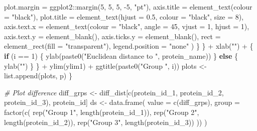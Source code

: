 \documentclass[
  11pt,
  oneside]{book}
\newenvironment{Shaded}{\begin{snugshade}}{\end{snugshade}}
\newcommand{\AttributeTok}[1]{\textcolor[rgb]{0.77,0.63,0.00}{#1}}
\newcommand{\CommentTok}[1]{\textcolor[rgb]{0.56,0.35,0.01}{\textit{#1}}}
\newcommand{\ControlFlowTok}[1]{\textcolor[rgb]{0.13,0.29,0.53}{\textbf{#1}}}
\newcommand{\DecValTok}[1]{\textcolor[rgb]{0.00,0.00,0.81}{#1}}
\newcommand{\FloatTok}[1]{\textcolor[rgb]{0.00,0.00,0.81}{#1}}
\newcommand{\FunctionTok}[1]{\textcolor[rgb]{0.00,0.00,0.00}{#1}}
\newcommand{\NormalTok}[1]{#1}
\newcommand{\OtherTok}[1]{\textcolor[rgb]{0.56,0.35,0.01}{#1}}
\newcommand{\SpecialCharTok}[1]{\textcolor[rgb]{0.00,0.00,0.00}{#1}}
\newcommand{\StringTok}[1]{\textcolor[rgb]{0.31,0.60,0.02}{#1}}
\begin{document}
\begin{Shaded}
\begin{Highlighting}[]
            \AttributeTok{plot.margin =}\NormalTok{ ggplot2}\SpecialCharTok{::}\FunctionTok{margin}\NormalTok{(}\DecValTok{5}\NormalTok{, }\DecValTok{5}\NormalTok{, }\DecValTok{5}\NormalTok{, }\SpecialCharTok{{-}}\DecValTok{5}\NormalTok{, }\StringTok{"pt"}\NormalTok{),}
            \AttributeTok{axis.title =} \FunctionTok{element\_text}\NormalTok{(}\AttributeTok{colour =} \StringTok{"black"}\NormalTok{),}
            \AttributeTok{plot.title =} \FunctionTok{element\_text}\NormalTok{(}\AttributeTok{hjust =} \FloatTok{0.5}\NormalTok{, }\AttributeTok{colour =} \StringTok{"black"}\NormalTok{, }\AttributeTok{size =} \DecValTok{8}\NormalTok{),}
            \AttributeTok{axis.text.x =} \FunctionTok{element\_text}\NormalTok{(}\AttributeTok{colour =} \StringTok{"black"}\NormalTok{, }\AttributeTok{angle =} \DecValTok{45}\NormalTok{, }\AttributeTok{vjust =} \DecValTok{1}\NormalTok{, }\AttributeTok{hjust =} \DecValTok{1}\NormalTok{),}
            \AttributeTok{axis.text.y =} \FunctionTok{element\_blank}\NormalTok{(),}
            \AttributeTok{axis.ticks.y =} \FunctionTok{element\_blank}\NormalTok{(),}
            \AttributeTok{rect =} \FunctionTok{element\_rect}\NormalTok{(}\AttributeTok{fill =} \StringTok{"transparent"}\NormalTok{),}
            \AttributeTok{legend.position =} \StringTok{"none"}
\NormalTok{          )}
\NormalTok{        \}}
\NormalTok{      \} }\SpecialCharTok{+}
      \FunctionTok{xlab}\NormalTok{(}\StringTok{""}\NormalTok{) }\SpecialCharTok{+}
\NormalTok{      \{}
        \ControlFlowTok{if}\NormalTok{ (i }\SpecialCharTok{==} \DecValTok{1}\NormalTok{) \{}
          \FunctionTok{ylab}\NormalTok{(}\FunctionTok{paste0}\NormalTok{(}\StringTok{"Euclidean distance to "}\NormalTok{, protein\_name))}
\NormalTok{        \} }\ControlFlowTok{else}\NormalTok{ \{}
          \FunctionTok{ylab}\NormalTok{(}\StringTok{""}\NormalTok{)}
\NormalTok{        \}}
\NormalTok{      \} }\SpecialCharTok{+}
      \FunctionTok{ylim}\NormalTok{(ylim1) }\SpecialCharTok{+}
      \FunctionTok{ggtitle}\NormalTok{(}\FunctionTok{paste0}\NormalTok{(}\StringTok{"Group "}\NormalTok{, i))}
\NormalTok{    plots }\OtherTok{\textless{}{-}} \FunctionTok{list.append}\NormalTok{(plots, p)}
\NormalTok{  \}}

  \CommentTok{\# Plot difference}
\NormalTok{  diff\_grps }\OtherTok{\textless{}{-}}\NormalTok{ diff\_dist[}\FunctionTok{c}\NormalTok{(protein\_id\_1, protein\_id\_2, protein\_id\_3), protein\_id]}
\NormalTok{  ds }\OtherTok{\textless{}{-}} \FunctionTok{data.frame}\NormalTok{(}
    \AttributeTok{value =} \FunctionTok{c}\NormalTok{(diff\_grps),}
    \AttributeTok{group =} \FunctionTok{factor}\NormalTok{(}\FunctionTok{c}\NormalTok{(}
      \FunctionTok{rep}\NormalTok{(}\StringTok{"Group 1"}\NormalTok{, }\FunctionTok{length}\NormalTok{(protein\_id\_1)),}
      \FunctionTok{rep}\NormalTok{(}\StringTok{"Group 2"}\NormalTok{, }\FunctionTok{length}\NormalTok{(protein\_id\_2)),}
      \FunctionTok{rep}\NormalTok{(}\StringTok{"Group 3"}\NormalTok{, }\FunctionTok{length}\NormalTok{(protein\_id\_3))}
\NormalTok{    ))}
\NormalTok{  )}


\end{Highlighting}
\end{Shaded}
\end{document}
